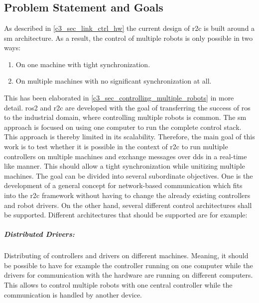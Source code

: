 \chapter{}
\label{sec:concept}
\section{Problem Statement and Goals}
As described in \autoref{c3_sec_link_ctrl_hw} the current design of \gls{r2c} is built around a \gls{sm} architecture. As a result, the control of multiple robots is only possible in two ways: 
\begin{enumerate}
    \item On one machine with tight synchronization. 
    \item On multiple machines with no significant synchronization at all.
\end{enumerate}
This has been elaborated in \autoref{c3_sec_controlling_multiple_robots} in more detail. \gls{ros2} and \gls{r2c} are developed with the goal of transferring the success of \gls{ros} to the industrial domain, where controlling multiple robots is common. The \gls{sm} approach is focused on using one computer to run the complete control stack. This approach is thereby limited in its scalability. Therefore, the main goal of this work is to test whether it is possible in the context of \gls{r2c} to run multiple controllers on multiple machines and exchange messages over \gls{dds} in a real-time like manner. This should allow a tight synchronization while unitizing multiple machines.\newline
The goal can be divided into several subordinate objectives. One is the development of a general concept for network-based communication which fits into the \gls{r2c} framework without having to change the already existing controllers and robot drivers. On the other hand, several different control architectures shall be supported. Different architectures that should be supported are for example:
\paragraph{Distributed Drivers:}\label{c4_sec_distributed_drivers}
 Distributing of controllers and drivers on different machines. Meaning, it should be possible to have for example the controller running on one computer while the drivers for communication with the hardware are running on different computers. This allows to control multiple robots with one central controller while the communication is handled by another device.
